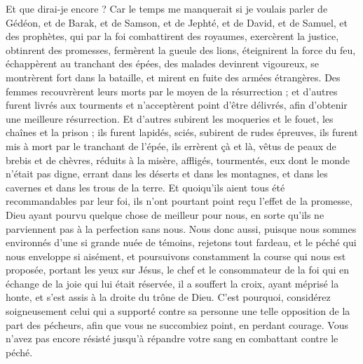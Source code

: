 \begin{multicols}{2}
Et que dirai-je encore ? Car le temps me manquerait si je voulais parler de Gédéon, et de Barak, et de Samson, et de Jephté, et de David, et de Samuel, et des prophètes,
qui par la foi combattirent des royaumes, exercèrent la justice, obtinrent des promesses, fermèrent la gueule des lions,
éteignirent la force du feu, échappèrent au tranchant des épées, des malades devinrent vigoureux, se montrèrent fort dans la bataille, et mirent en fuite des armées étrangères.
Des femmes recouvrèrent leurs morts par le moyen de la résurrection ; et d'autres furent livrés aux tourments et n'acceptèrent point d'être délivrés, afin d'obtenir une meilleure résurrection.
Et d'autres subirent les moqueries et le fouet, les chaînes et la prison ;
ils furent lapidés, sciés, subirent de rudes épreuves, ils furent mis à mort par le tranchant de l'épée, ils errèrent çà et là, vêtus de peaux de brebis et de chèvres, réduits à la misère, affligés, tourmentés,
eux dont le monde n'était pas digne, errant dans les déserts et dans les montagnes, et dans les cavernes et dans les trous de la terre.
 Et quoiqu'ils aient tous été recommandables par leur foi, ils n'ont pourtant point reçu l'effet de  la promesse,
Dieu ayant pourvu quelque chose de meilleur pour nous, en sorte qu'ils ne parviennent pas à la perfection sans nous.
\VerseOne{}Nous donc aussi, puisque nous sommes environnés d'une si grande nuée de témoins, rejetons tout fardeau, et le péché qui nous enveloppe si aisément, et poursuivons constamment la course qui nous est proposée,
portant les yeux sur Jésus, le chef et le consommateur de la foi qui en échange de la joie qui lui était réservée, il a souffert la croix, ayant méprisé la honte, et s'est assis à la droite du trône de Dieu.
C'est pourquoi, considérez soigneusement celui qui a supporté contre sa personne une telle opposition de la part des pécheurs, afin que vous ne succombiez point, en perdant courage.
Vous n'avez pas encore résisté jusqu'à répandre votre sang en combattant contre le péché.

\end{multicols}
